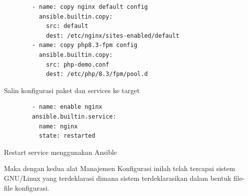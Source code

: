 \documentclass[10pt,]{report}
\newenvironment{code}{\captionsetup{type=listing}}{\vspace{3mm}}
\begin{document}
\begin{adjustwidth}{20pt}{}
\begin{adjustwidth}{20pt}{}
		\begin{code}
			\begin{verbatim}
        - name: copy nginx default config
          ansible.builtin.copy:
            src: default
            dest: /etc/nginx/sites-enabled/default
        - name: copy php8.3-fpm config
          ansible.builtin.copy:
            src: php-demo.conf
            dest: /etc/php/8.3/fpm/pool.d
      \end{verbatim}
			\caption{Salin konfigurasi paket dan services ke target}
		\end{code}

		\begin{code}
			\begin{verbatim}
        - name: enable nginx
        ansible.builtin.service:
          name: nginx
          state: restarted
      \end{verbatim}
			\caption{Restart service menggunakan Ansible}
		\end{code}

		Maka dengan kedua alat Manajemen Konfigurasi inilah telah tercapai sistem
		GNU/Linux yang terdeklarasi dimana sistem terdeklarasikan dalam bentuk
		file-file konfigurasi.
	\end{adjustwidth}
\end{adjustwidth}
\newpage
\end{document}
